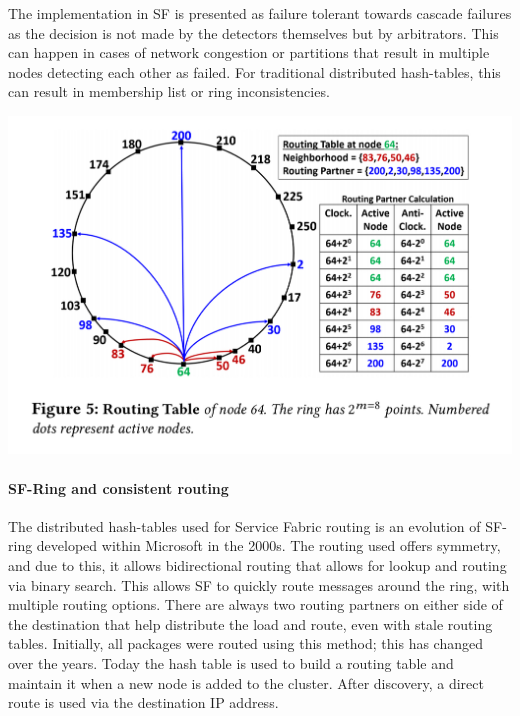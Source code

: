 \documentclass[a4paper,10pt,titlepage]{report}
\begin{document}
    The implementation in SF is presented as failure tolerant towards cascade failures as the decision is not made by the detectors themselves but by arbitrators.
    This can happen in cases of network congestion or partitions that result in multiple nodes detecting each other as failed. For traditional distributed hash-tables, this can result in membership list or ring inconsistencies.\\ 
    \vspace{5mm}

    \includegraphics[scale=0.3]{images/servicefabric-fig-ring-topology.jpeg}

    \paragraph{SF-Ring and consistent routing}

    The distributed hash-tables used for Service Fabric routing is an evolution of SF-ring developed within Microsoft in the 2000s. The routing used offers symmetry, and due to this, it allows bidirectional routing that allows for lookup and routing via binary search. This allows SF to quickly route messages around the ring, with multiple routing options. There are always two routing partners on either side of the destination that help distribute the load and route, even with stale routing tables. Initially, all packages were routed using this method; this has changed over the years. Today the hash table is used to build a routing table and maintain it when a new node is added to the cluster. After discovery, a direct route is used via the destination IP address. \\
    \vspace{5mm}
\end{document}
